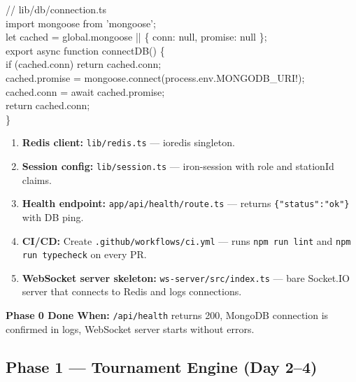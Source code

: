 \documentclass[11pt, a4paper]{article}
\begin{document}
\begin{tcolorbox}[codebox]
\small\color{white}\ttfamily
\textcolor{codegreen}{// lib/db/connection.ts}\\
import mongoose from 'mongoose';\\
let cached = global.mongoose || \{ conn: null, promise: null \};\\
export async function connectDB() \{\\
\quad if (cached.conn) return cached.conn;\\
\quad cached.promise = mongoose.connect(process.env.MONGODB\_URI!);\\
\quad cached.conn = await cached.promise;\\
\quad return cached.conn;\\
\}
\end{tcolorbox}

\begin{enumerate}[leftmargin=1.5cm, itemsep=3pt, start=3]
    \item \textbf{Redis client:} \texttt{lib/redis.ts} --- ioredis singleton.
    \item \textbf{Session config:} \texttt{lib/session.ts} --- iron-session with role and stationId claims.
    \item \textbf{Health endpoint:} \texttt{app/api/health/route.ts} --- returns \texttt{\{"status":"ok"\}} with DB ping.
    \item \textbf{CI/CD:} Create \texttt{.github/workflows/ci.yml} --- runs \texttt{npm run lint} and \texttt{npm run typecheck} on every PR.
    \item \textbf{WebSocket server skeleton:} \texttt{ws-server/src/index.ts} --- bare Socket.IO server that connects to Redis and logs connections.
\end{enumerate}

\textbf{Phase 0 Done When:} \texttt{/api/health} returns 200, MongoDB connection is confirmed in logs, WebSocket server starts without errors.

\subsection{Phase 1 --- Tournament Engine (Day 2--4)}
\end{document}
